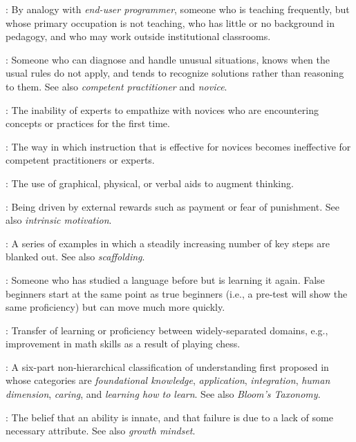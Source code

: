 \begin{description}
: By analogy with
\emph{end-user programmer}, someone who is teaching frequently, but whose
primary occupation is not teaching, who has little or no background in
pedagogy, and who may work outside institutional classrooms.

: Someone who can diagnose and handle
unusual situations, knows when the usual rules do not apply, and tends
to recognize solutions rather than reasoning to them. See also
\emph{competent practitioner} and \emph{novice}.

: The inability of
experts to empathize with novices who are encountering concepts or
practices for the first time.

: The way in
which instruction that is effective for novices becomes ineffective for
competent practitioners or experts.

: The use
of graphical, physical, or verbal aids to augment thinking.

: Being driven
by external rewards such as payment or fear of punishment. See also
\emph{intrinsic motivation}.

: A series of examples in
which a steadily increasing number of key steps are blanked out. See
also \emph{scaffolding}.

: Someone who has studied a
language before but is learning it again. False beginners start at the
same point as true beginners (i.e., a pre-test will show the same
proficiency) but can move much more quickly.

: Transfer of learning or
proficiency between widely-separated domains, e.g., improvement in math
skills as a result of playing chess.

: A six-part
non-hierarchical classification of understanding first proposed in
\cite{Fink2013} whose categories are \emph{foundational knowledge},
\emph{application}, \emph{integration}, \emph{human dimension}, \emph{caring}, and \emph{learning
how to learn}. See also \emph{Bloom's Taxonomy}.

: The belief that an ability
is innate, and that failure is due to a lack of some necessary
attribute. See also \emph{growth mindset}.


\end{description}
